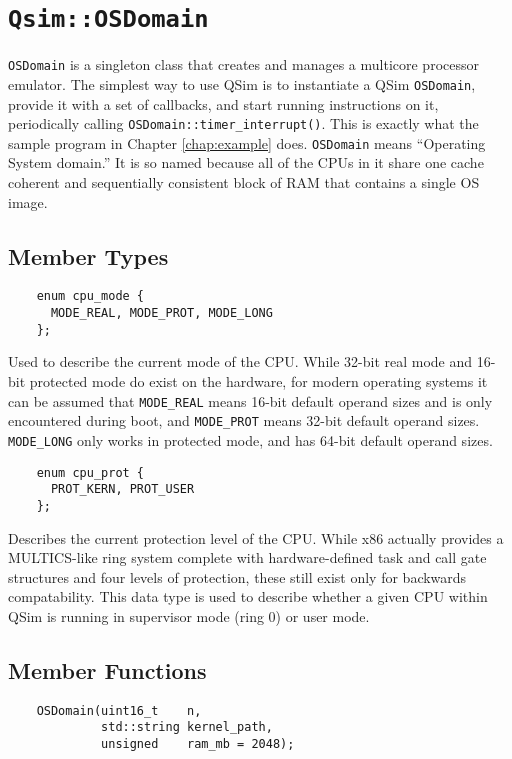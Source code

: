 \documentclass[letterpaper, 10pt]{book}
\begin{document}
\newpage

\section{\texttt{Qsim::OSDomain}} \label{class:OSDomain}

\texttt{OSDomain} is a singleton class that creates and manages a multicore
processor emulator. The simplest way to use QSim is to instantiate a QSim
\texttt{OSDomain}, provide it with a set of callbacks, and start running instructions on it, periodically calling  \texttt{OSDomain::timer\_interrupt()}.
This is exactly what the sample program
in Chapter \ref{chap:example} does. \texttt{OSDomain} means ``Operating System
domain.'' It is so named because all of the CPUs in it share one cache coherent
and sequentially consistent block of RAM that contains a single OS image.

\subsection{Member Types}
\label{enum:cpu_mode} \begin{verbatim}
    enum cpu_mode {
      MODE_REAL, MODE_PROT, MODE_LONG
    };
\end{verbatim}

Used to describe the current mode of the CPU. While 32-bit real mode and 16-bit
protected mode do exist on the hardware, for modern operating systems it can be
assumed that \texttt{MODE\_REAL} means 16-bit default operand sizes and is only
encountered during boot, and \texttt{MODE\_PROT} means 32-bit default operand
sizes. \texttt{MODE\_LONG} only works in protected mode, and has 64-bit default
operand sizes.

\label{enum:cpu_prot} \begin{verbatim}
    enum cpu_prot {
      PROT_KERN, PROT_USER
    };
\end{verbatim}

Describes the current protection level of the CPU. While x86 actually provides
a MULTICS-like ring system complete with hardware-defined task and call gate
structures and four levels of protection, these still exist only for backwards
compatability. This data type is used to describe whether a given CPU within
QSim is running in supervisor mode (ring 0) or user mode.

\subsection{Member Functions}
\label{func:OSDomain} \begin{verbatim}
    OSDomain(uint16_t    n, 
             std::string kernel_path, 
             unsigned    ram_mb = 2048);
\end{verbatim}
\end{document}
